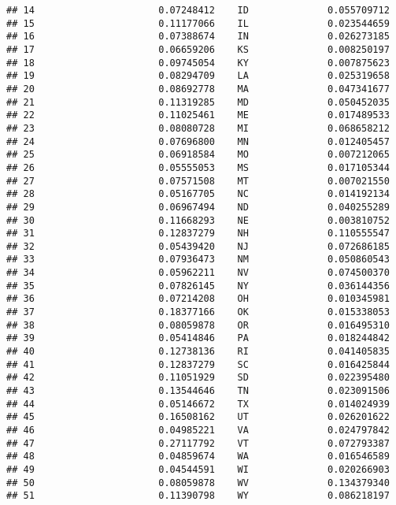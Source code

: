 \documentclass{article}\usepackage[]{graphicx}\usepackage[]{color}
\makeatletter
\newenvironment{kframe}{%
 \def\at@end@of@kframe{}%
 \ifinner\ifhmode%
  \def\at@end@of@kframe{\end{minipage}}%
  \begin{minipage}{\columnwidth}%
 \fi\fi%
 \def\FrameCommand##1{\hskip\@totalleftmargin \hskip-\fboxsep
 \colorbox{shadecolor}{##1}\hskip-\fboxsep
     \hskip-\linewidth \hskip-\@totalleftmargin \hskip\columnwidth}%
 \MakeFramed {\advance\hsize-\width
   \@totalleftmargin\z@ \linewidth\hsize
   \@setminipage}}%
 {\par\unskip\endMakeFramed%
 \at@end@of@kframe}
\newenvironment{knitrout}{}{} %
\makeatother
\begin{document}
\begin{knitrout}
\begin{kframe}
\begin{verbatim}
## 14                      0.07248412    ID              0.055709712
## 15                      0.11177066    IL              0.023544659
## 16                      0.07388674    IN              0.026273185
## 17                      0.06659206    KS              0.008250197
## 18                      0.09745054    KY              0.007875623
## 19                      0.08294709    LA              0.025319658
## 20                      0.08692778    MA              0.047341677
## 21                      0.11319285    MD              0.050452035
## 22                      0.11025461    ME              0.017489533
## 23                      0.08080728    MI              0.068658212
## 24                      0.07696800    MN              0.012405457
## 25                      0.06918584    MO              0.007212065
## 26                      0.05555053    MS              0.017105344
## 27                      0.07571508    MT              0.007021550
## 28                      0.05167705    NC              0.014192134
## 29                      0.06967494    ND              0.040255289
## 30                      0.11668293    NE              0.003810752
## 31                      0.12837279    NH              0.110555547
## 32                      0.05439420    NJ              0.072686185
## 33                      0.07936473    NM              0.050860543
## 34                      0.05962211    NV              0.074500370
## 35                      0.07826145    NY              0.036144356
## 36                      0.07214208    OH              0.010345981
## 37                      0.18377166    OK              0.015338053
## 38                      0.08059878    OR              0.016495310
## 39                      0.05414846    PA              0.018244842
## 40                      0.12738136    RI              0.041405835
## 41                      0.12837279    SC              0.016425844
## 42                      0.11051929    SD              0.022395480
## 43                      0.13544646    TN              0.023091506
## 44                      0.05146672    TX              0.014024939
## 45                      0.16508162    UT              0.026201622
## 46                      0.04985221    VA              0.024797842
## 47                      0.27117792    VT              0.072793387
## 48                      0.04859674    WA              0.016546589
## 49                      0.04544591    WI              0.020266903
## 50                      0.08059878    WV              0.134379340
## 51                      0.11390798    WY              0.086218197

\end{verbatim}
\end{kframe}
\end{knitrout}
\end{document}
